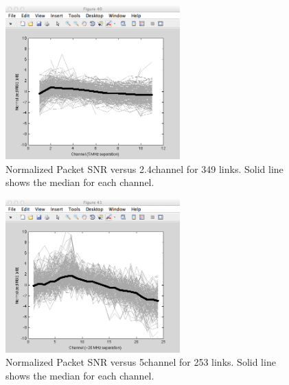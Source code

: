 \begin{figure}[htp]
	\centering
	\includegraphics[width=0.6\textwidth]{figures/esnr/rssi_vs_freq_24.png}
	\caption[Normalized Packet SNR versus 2.4\GHz channel for 349 links]{\label{fig:rssi_vs_freq_24}Normalized Packet SNR versus 2.4\GHz channel for 349 links. Solid line shows the median for each channel.}
\end{figure}
\begin{figure}[htp]
	\centering
	\includegraphics[width=0.6\textwidth]{figures/esnr/rssi_vs_freq_5.png}
	\caption[Normalized Packet SNR versus 5\GHz channel for 253 links]{\label{fig:rssi_vs_freq_5}Normalized Packet SNR versus 5\GHz channel for 253 links. Solid line shows the median for each channel.}
\end{figure}

